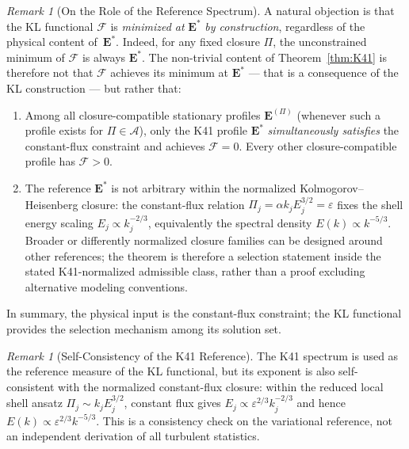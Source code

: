 \documentclass[12pt,a4paper]{article}
\theoremstyle{definition}
\theoremstyle{plain}
\theoremstyle{remark}
\newtheorem{remark}[definition]{Remark}
\begin{document}
\begin{remark}[On the Role of the Reference Spectrum]\label{rem:circularity}
A natural objection is that the KL functional $\mathcal{F}$ is
\emph{minimized at} $\mathbf{E}^*$ \emph{by construction}, regardless
of the physical content of~$\mathbf{E}^*$.  Indeed, for any fixed
closure $\Pi$, the unconstrained minimum of $\mathcal{F}$ is always
$\mathbf{E}^*$.  The non-trivial content of Theorem~\ref{thm:K41} is
therefore not that $\mathcal{F}$ achieves its minimum at $\mathbf{E}^*$
--- that is a consequence of the KL construction --- but rather that:
\begin{enumerate}
\item Among all closure-compatible stationary profiles
  $\mathbf{E}^{(\Pi)}$ (whenever such a profile exists for
  $\Pi \in \mathscr{A}$), only the K41 profile $\mathbf{E}^*$
  \emph{simultaneously satisfies} the constant-flux constraint and
  achieves $\mathcal{F} = 0$.  Every other closure-compatible profile
  has $\mathcal{F} > 0$.
\item The reference $\mathbf{E}^*$ is not arbitrary within the normalized
  Kolmogorov--Heisenberg closure: the constant-flux relation
  $\Pi_j=\alpha k_j E_j^{3/2}=\varepsilon$ fixes the shell energy scaling
  $E_j\propto k_j^{-2/3}$, equivalently the spectral density
  $E(k)\propto k^{-5/3}$.  Broader or differently normalized closure
  families can be designed around other references; the theorem is
  therefore a selection statement inside the stated K41-normalized
  admissible class, rather than a proof excluding alternative modeling
  conventions.
\end{enumerate}
In summary, the physical input is the constant-flux constraint; the KL
functional provides the selection mechanism among its solution set.
\end{remark}

\begin{remark}[Self-Consistency of the K41 Reference]
\label{rem:k41-selfconsistency}
The K41 spectrum is used as the reference measure of the KL functional, but
its exponent is also self-consistent with the normalized constant-flux
closure: within the reduced local shell ansatz
$\Pi_j\sim k_j E_j^{3/2}$, constant flux gives
$E_j\propto \varepsilon^{2/3}k_j^{-2/3}$ and hence
$E(k)\propto \varepsilon^{2/3}k^{-5/3}$.  This is a consistency check on
the variational reference, not an independent derivation of all turbulent
statistics.
\end{remark}
\end{document}
